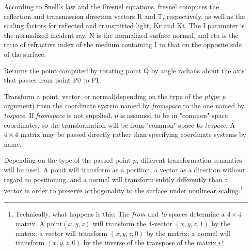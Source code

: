 \documentclass[11pt,letterpaper]{book}
\def\normal{{\cf normal}\xspace}
\def\point{{\cf point}\xspace}
\def\vector{{\cf vector}\xspace}
\def\commonspace{{\cf "common"} space\xspace}
\begin{document}
According to Snell's law and the Fresnel equations, {\cf fresnel}
computes the reflection and transmission direction vectors {\cf R} and
{\cf T}, respectively, as well as the scaling factors for reflected
and transmitted light, {\cf Kr} and {\cf Kt}.  The {\cf I} parameter
is the normalized incident ray, {\cf N} is the normalized surface normal,
and {\cf eta} is the ratio of refractive index of the medium
containing {\cf I} to that on the opposite side of the surface.
\apiend

Returns the point computed by rotating point {\cf Q} by {\cf angle} 
radians about the axis that passes from point {\cf P0} to {\cf P1}.
\apiend


Transform a \point, \vector, or \normal (depending on the type of the
\emph{ptype p} argument) from the coordinate system named by
\emph{fromspace} to the one named by \emph{tospace}.  If 
\emph{fromspace} is not supplied, $p$ is assumed to be in \commonspace
coordinates, so the transformation will be from \commonspace to
\emph{tospace}.  A $4 \times 4$ matrix may be passed directly rather
than specifying coordinate systems by name.

Depending on the type of the passed point $p$, different transformation
semantics will be used.  A \point will transform as a position, a
\vector as a direction without regard to positioning, and a \normal will
transform subtly differently than a \vector in order to preserve
orthogonality to the surface under nonlinear
scaling.\footnote{Technically, what happens is this: The \emph{from} and
  \emph{to} spaces determine a $4 \times 4$ matrix.  A \point $(x,y,z)$
  will transform the 4-vector $(x,y,z,1)$ by the matrix; a \vector will
  transform $(x,y,z,0)$ by the matrix; a \normal will transform
  $(x,y,z,0)$ by the inverse of the transpose of the matrix.}
\end{document}
